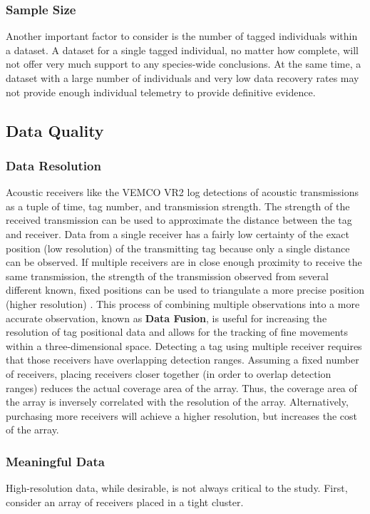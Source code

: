\subsubsection{Sample Size}
\label{sampleSize}
Another important factor to consider is the number of tagged individuals within a dataset.  A dataset for a single tagged individual, no matter how complete, will not offer very much support to any species-wide conclusions.  At the same time, a dataset with a large number of individuals and very low data recovery rates may not provide enough individual telemetry to provide definitive evidence.

\subsection{Data Quality}
\label{dataQuality}
\subsubsection{Data Resolution}
\label{dataResolution}
\label{dataFusion}
Acoustic receivers like the VEMCO VR2 log detections of acoustic transmissions as a tuple of time, tag number, and transmission strength.  The strength of the received transmission can be used to approximate the distance between the tag and receiver.  Data from a single receiver has a fairly low certainty of the exact position (low resolution) of the transmitting tag because only a single distance can be observed.  If multiple receivers are in close enough proximity to receive the same transmission, the strength of the transmission observed from several different known, fixed positions can be used to triangulate a more precise position (higher resolution) \cite{statespacemodel}.  This process of combining multiple observations into a more accurate observation, known as \textbf{Data Fusion}, is useful for increasing the resolution of tag positional data and allows for the tracking of fine movements within a three-dimensional space.  Detecting a tag using multiple receiver requires that those receivers have overlapping detection ranges\cite{Zhaohui2008}.  Assuming a fixed number of receivers, placing receivers closer together (in order to overlap detection ranges) reduces the actual coverage area of the array.  Thus, the coverage area of the array is inversely correlated with the resolution of the array.  Alternatively, purchasing more receivers will achieve a higher resolution, but increases the cost of the array.


\subsubsection{Meaningful Data}
\label{meaningfulData}
High-resolution data, while desirable, is not always critical to the study.  First, consider an array of receivers placed in a tight cluster.


